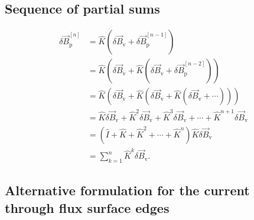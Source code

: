\subsection{Sequence of partial sums}

\begin{align}
  \delta \vec{B}_{\text{p}}^{[n]} &= \hat{K} \left ( \delta \vec{B}_{\text{v}} + \delta \vec{B}_{\text{p}}^{[n-1]} \right ) \nonumber \\
  &= \hat{K} \left ( \delta \vec{B}_{\text{v}} + \hat{K} \left ( \delta \vec{B}_{\text{v}} + \delta \vec{B}_{\text{p}}^{[n-2]} \right ) \right ) \nonumber \\
  &= \hat{K} \left ( \delta \vec{B}_{\text{v}} + \hat{K} \left ( \delta \vec{B}_{\text{v}} + \hat{K} \left ( \delta \vec{B}_{\text{v}} + \dotsb \right ) \right ) \right ) \nonumber \\
  &= \hat{K} \delta \vec{B}_{\text{v}} + \hat{K}^{2} \delta \vec{B}_{\text{v}} + \hat{K}^{3} \delta \vec{B}_{\text{v}} + \dotsb + \hat{K}^{n+1} \delta \vec{B}_{\text{v}} \nonumber \\
  &= \left ( \hat{I} + \hat{K} + \hat{K}^{2} + \dotsb + \hat{K}^{n} \right ) \hat{K} \delta \vec{B}_{\text{v}} \nonumber \\
  &= \sum_{k = 1}^{n} \hat{K}^{k} \delta \vec{B}_{\text{v}}.
\end{align}


\subsection{Alternative formulation for the current through flux surface edges}

